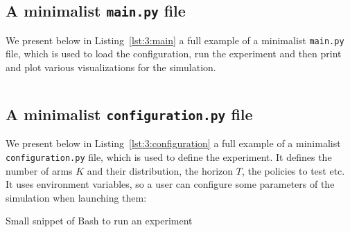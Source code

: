 \subsection{A minimalist \texttt{main.py} file}

We present below in Listing~\ref{lst:3:main} a full example of a minimalist \texttt{main.py} file,
which is used to load the configuration, run the experiment and then print and plot various visualizations for the simulation.

\begin{small}
    \inputminted[linenos=true,numbersep=5pt,frame=lines,framesep=2mm]{python3}{2-Chapters/3-Chapter/src/example_of_main_singleplayer.py}
\end{small}

\subsection{A minimalist \texttt{configuration.py} file}

We present below in Listing~\ref{lst:3:configuration} a full example of a minimalist \texttt{configuration.py} file,
which is used to define the experiment.
It defines the number of arms $K$ and their distribution, the horizon $T$, the policies to test etc.
It uses environment variables, so a user can configure some parameters of the simulation when launching them:


\begin{small}
    \begin{listing}[h!]
        \caption{Small snippet of Bash to run an experiment}
        \label{lst:3:howToRunExperiment2}
    \end{listing}
\end{small}

